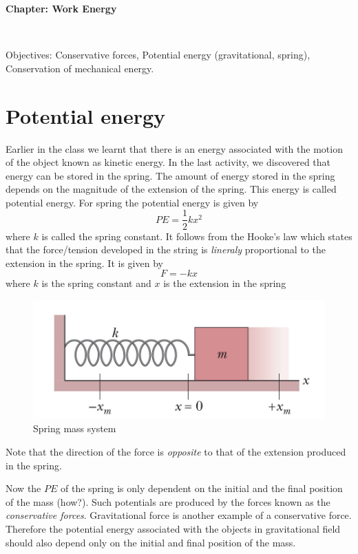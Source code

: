 \documentclass[10pt]{article}
\date{2014-6-22}
\begin{document}
\begin{center}
\begin{Large}\textbf{Chapter: Work Energy}\end{Large} \\
\smallskip
\end{center}
Objectives: Conservative forces, Potential energy (gravitational, spring), Conservation of mechanical energy.
\section{Potential energy}
Earlier in the class we learnt that there is an energy associated with the motion of the object known as kinetic energy.  In the last activity, we discovered that energy can be stored in the spring.  The amount of energy stored in the spring depends on the magnitude of the extension of the spring.  This energy is called potential energy.  For spring the potential energy is given by
\begin{equation}
  PE = \frac{1}{2}kx^2
\end{equation}
where $k$ is called the spring constant.  It follows from the Hooke's law which states that the force/tension developed in the string is \emph{lineraly} proportional to the extension in the spring.  It is given by
\begin{equation}
  F = -kx
\end{equation}
where $k$ is the spring constant and $x$ is the extension in the spring
\begin{figure}[h]
\label{springhooke}
\includegraphics[scale=1]{springhooke}
\centering
\caption{Spring mass system}
\centering
\end{figure}
Note that the direction of the force is \emph{opposite} to that of the extension produced in the spring.

Now the $PE$ of the spring is only dependent on the initial and the final position of the mass (how?).  Such potentials are produced by the forces known as the \emph{conservative forces}.  Gravitational force is another example of a conservative force.  Therefore the potential energy associated with the objects in gravitational field should also depend only on the initial and final position of the mass.  
\end{document}
